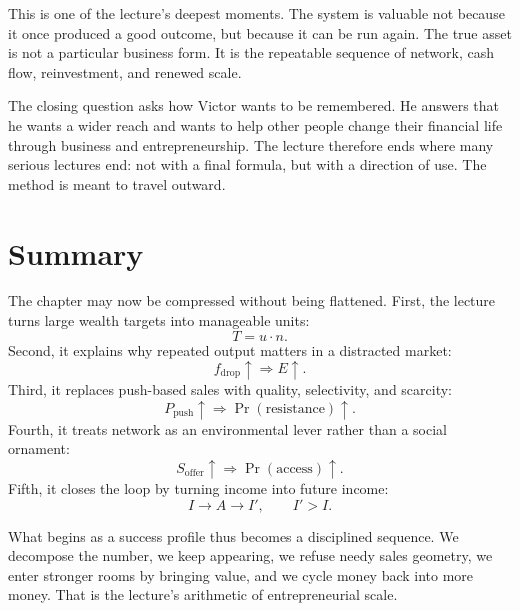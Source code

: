 This is one of the lecture's deepest moments. The system is valuable not because it once produced a good outcome, but because it can be run again. The true asset is not a particular business form. It is the repeatable sequence of network, cash flow, reinvestment, and renewed scale.

The closing question asks how Victor wants to be remembered. He answers that he wants a wider reach and wants to help other people change their financial life through business and entrepreneurship. The lecture therefore ends where many serious lectures end: not with a final formula, but with a direction of use. The method is meant to travel outward.

\section{Summary}

The chapter may now be compressed without being flattened. First, the lecture turns large wealth targets into manageable units:
\[
T = u \cdot n.
\]
Second, it explains why repeated output matters in a distracted market:
\[
f_{\text{drop}} \uparrow \Rightarrow E \uparrow.
\]
Third, it replaces push-based sales with quality, selectivity, and scarcity:
\[
P_{\text{push}} \uparrow \Rightarrow \Pr(\text{resistance}) \uparrow.
\]
Fourth, it treats network as an environmental lever rather than a social ornament:
\[
S_{\text{offer}} \uparrow \Rightarrow \Pr(\text{access}) \uparrow.
\]
Fifth, it closes the loop by turning income into future income:
\[
I \to A \to I', \qquad I' > I.
\]

What begins as a success profile thus becomes a disciplined sequence. We decompose the number, we keep appearing, we refuse needy sales geometry, we enter stronger rooms by bringing value, and we cycle money back into more money. That is the lecture's arithmetic of entrepreneurial scale.